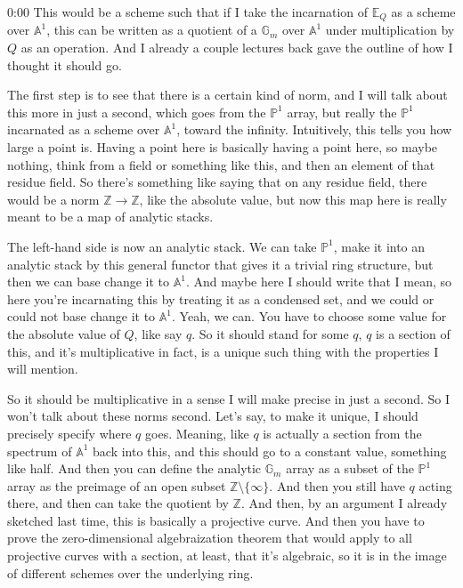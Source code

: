 \begin{unfinished}{0:00}
This would be a scheme such that if I take the incarnation of $\mathbb{E}_Q$ as a scheme over $\mathbb{A}^1$, this can be written as a quotient of a $\mathbb{G}_m$ over $\mathbb{A}^1$ under multiplication by $Q$ as an operation. And I already a couple lectures back gave the outline of how I thought it should go.

The first step is to see that there is a certain kind of norm, and I will talk about this more in just a second, which goes from the $\mathbb{P}^1$ array, but really the $\mathbb{P}^1$ incarnated as a scheme over $\mathbb{A}^1$, toward the infinity. Intuitively, this tells you how large a point is. Having a point here is basically having a point here, so maybe nothing, think from a field or something like this, and then an element of that residue field. So there's something like saying that on any residue field, there would be a norm $\mathbb{Z} \to \mathbb{Z}$, like the absolute value, but now this map here is really meant to be a map of analytic stacks.

The left-hand side is now an analytic stack. We can take $\mathbb{P}^1$, make it into an analytic stack by this general functor that gives it a trivial ring structure, but then we can base change it to $\mathbb{A}^1$. And maybe here I should write that I mean, so here you're incarnating this by treating it as a condensed set, and we could or could not base change it to $\mathbb{A}^1$. Yeah, we can. You have to choose some value for the absolute value of $Q$, like say $q$. So it should stand for some $q$, $q$ is a section of this, and it's multiplicative in fact, is a unique such thing with the properties I will mention. 

So it should be multiplicative in a sense I will make precise in just a second. So I won't talk about these norms second. Let's say, to make it unique, I should precisely specify where $q$ goes. Meaning, like $q$ is actually a section from the spectrum of $\mathbb{A}^1$ back into this, and this should go to a constant value, something like half. And then you can define the analytic $\mathbb{G}_m$ array as a subset of the $\mathbb{P}^1$ array as the preimage of an open subset $\mathbb{Z}\setminus\{\infty\}$. And then you still have $q$ acting there, and then can take the quotient by $\mathbb{Z}$. And then, by an argument I already sketched last time, this is basically a projective curve. And then you have to prove the zero-dimensional algebraization theorem that would apply to all projective curves with a section, at least, that it's algebraic, so it is in the image of different schemes over the underlying ring.


\end{unfinished}

